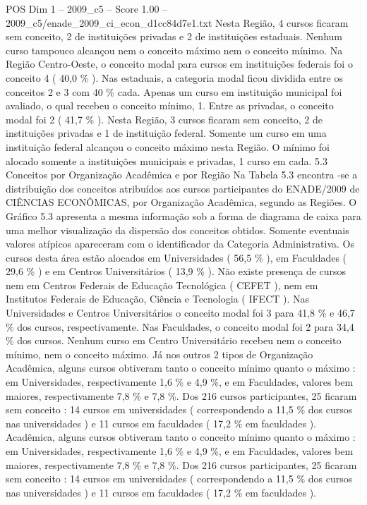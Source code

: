 \begin{textsample}{POS Dim 1 – 2009\_c5 – Score 1.00 – 2009\_c5/enade\_2009\_ci\_econ\_d1cc84d7e1.txt}
Nesta Região, 4 cursos ficaram sem conceito, 2 de instituições privadas e 2 de instituições estaduais.
Nenhum curso tampouco alcançou nem o conceito máximo nem o conceito mínimo.
Na Região Centro-Oeste, o conceito modal para cursos em instituições federais foi o conceito 4 ( 40,0 \% ).
Nas estaduais, a categoria modal ficou dividida entre os conceitos 2 e 3 com 40 \% cada.
Apenas um curso em instituição municipal foi avaliado, o qual recebeu o conceito mínimo, 1.
Entre as privadas, o conceito modal foi 2 ( 41,7 \% ).
Nesta Região, 3 cursos ficaram sem conceito, 2 de instituições privadas e 1 de instituição federal.
Somente um curso em uma instituição federal alcançou o conceito máximo nesta Região.
O mínimo foi alocado somente a instituições municipais e privadas, 1 curso em cada. 5.3 Conceitos por Organização Acadêmica e por Região Na Tabela 5.3 encontra -se a distribuição dos conceitos atribuídos aos cursos participantes do ENADE/2009 de CIÊNCIAS ECONÔMICAS, por Organização Acadêmica, segundo as Regiões.
O Gráfico 5.3 apresenta a mesma informação sob a forma de diagrama de caixa para uma melhor visualização da dispersão dos conceitos obtidos.
Somente eventuais valores atípicos apareceram com o identificador da Categoria Administrativa.
Os cursos desta área estão alocados em Universidades ( 56,5 \% ), em Faculdades ( 29,6 \% ) e em Centros Universitários ( 13,9 \% ).
Não existe presença de cursos nem em Centros Federais de Educação Tecnológica ( CEFET ), nem em Institutos Federais de Educação, Ciência e Tecnologia ( IFECT ).
Nas Universidades e Centros Universitários o conceito modal foi 3 para 41,8 \% e 46,7 \% dos cursos, respectivamente.
Nas Faculdades, o conceito modal foi 2 para 34,4 \% dos cursos.
Nenhum curso em Centro Universitário recebeu nem o conceito mínimo, nem o conceito máximo.
Já nos outros 2 tipos de Organização Acadêmica, alguns cursos obtiveram tanto o conceito mínimo quanto o máximo : em Universidades, respectivamente 1,6 \% e 4,9 \%, e em Faculdades, valores bem maiores, respectivamente 7,8 \% e 7,8 \%.
Dos 216 cursos participantes, 25 ficaram sem conceito : 14 cursos em universidades ( correspondendo a 11,5 \% dos cursos nas universidades ) e 11 cursos em faculdades ( 17,2 \% em faculdades ).
Acadêmica, alguns cursos obtiveram tanto o conceito mínimo quanto o máximo : em Universidades, respectivamente 1,6 \% e 4,9 \%, e em Faculdades, valores bem maiores, respectivamente 7,8 \% e 7,8 \%.
Dos 216 cursos participantes, 25 ficaram sem conceito : 14 cursos em universidades ( correspondendo a 11,5 \% dos cursos nas universidades ) e 11 cursos em faculdades ( 17,2 \% em faculdades ).

\end{textsample}
